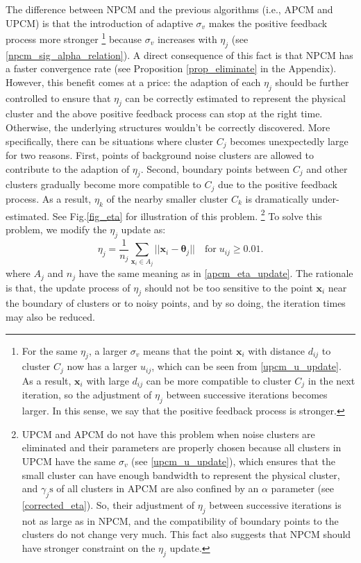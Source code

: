 \documentclass[journal]{IEEEtran}
\theoremstyle{definition}
\begin{document}
The difference between NPCM and the previous algorithms (i.e., APCM and UPCM) is that the introduction of adaptive $\sigma_v$ makes the positive feedback process more stronger 
\footnote{For the same $\eta_j$, a larger $\sigma_v$ means that the point $\mathbf{x}_i$ with distance $d_{ij}$ to cluster $C_j$ now has a larger $u_{ij}$, which can be seen from \eqref{upcm_u_update}. As a result, $\mathbf{x}_i$ with large $d_{ij}$ can be more compatible to cluster $C_j$ in the next iteration, so the adjustment of $\eta_j$ between successive iterations becomes larger. In this sense, we say that the positive feedback process is stronger.} 
because $\sigma_v$ increases with $\eta_j$ (see \eqref{npcm_sig_alpha_relation}). A direct consequence of this fact is that NPCM has a faster convergence rate (see Proposition \ref{prop_eliminate} in the Appendix).
However, this benefit comes at a price: the adaption of each $\eta_j$ should be further controlled to ensure that $\eta_j$ can be correctly estimated to represent the physical cluster and the above positive feedback process can stop at the right time. Otherwise, the underlying structures wouldn't be correctly discovered.
More specifically, there can be situations where cluster $C_j$ becomes unexpectedly large for two reasons. First, points of background noise clusters are allowed to contribute to the adaption of $\eta_j$. Second, boundary points between $C_j$ and other clusters gradually become more compatible to $C_j$ due to the positive feedback process. As a result, $\eta_k$ of the nearby smaller cluster $C_k$ is dramatically under-estimated. See Fig.\ref{fig_eta} for illustration of this problem.
\footnote{UPCM and APCM do not have this problem when noise clusters are eliminated and their parameters are properly chosen because all clusters in UPCM have the same $\sigma_v$ (see \eqref{upcm_u_update}), which ensures that the small cluster can have enough bandwidth to represent the physical cluster, and $\gamma_j\text{s}$ of all clusters in APCM are also confined by an $\alpha$ parameter (see \eqref{corrected_eta}). So, their adjustment of $\eta_j$ between successive iterations is not as large as in NPCM, and the compatibility of boundary points to the clusters do not change very much. This fact also suggests that NPCM should have stronger constraint on the $\eta_j$ update.} 
To solve this problem, we modify the $\eta_j$ update as:
\begin{equation}
\label{npcm_eta_update}
\eta_j=\frac{1}{n_j}\sum_{\mathbf{x}_i\in A_j}||\mathbf{x}_i-\boldsymbol{\theta}_j|| \quad \text{for}\;u_{ij} \geq 0.01.
\end{equation}
where $A_j$ and $n_j$ have the same meaning as in \eqref{apcm_eta_update}. The rationale is that, the update process of $\eta_j$ should not be too sensitive to the point $\mathbf{x}_i$ near the boundary of clusters or to noisy points, and by so doing, the iteration times may also be reduced.
\end{document}
